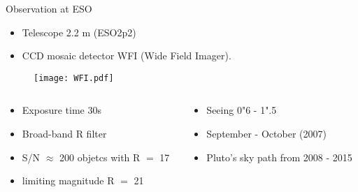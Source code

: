 \begin{frame}[t]{Observation at ESO}

\begin{itemize}
	\small
	\item Telescope 2.2 m (ESO2p2)
	\item CCD mosaic detector WFI (Wide Field Imager).
\end{itemize}
		\begin{figure}[tb]
		\centering
		\texttt{[image: WFI.pdf]}
		\end{figure}
\footnotesize{
		\begin{columns}[t]
		\begin{column}[T]{5.5cm}
			\begin{itemize}
				\item Exposure time 30s
				\item Broad-band R filter
				\item S/N $\approx$ 200 objetcs with R $=$ 17
				\item limiting magnitude R $=$ 21
			\end{itemize}
		\end{column} 
		\begin{column}[T]{5.5cm}
			\begin{itemize}
				\item Seeing 0"6 - 1".5
				\item September - October (2007)
				\item Pluto's sky path from 2008 - 2015
			\end{itemize}
		\end{column}
		\end{columns}}




\end{frame}
